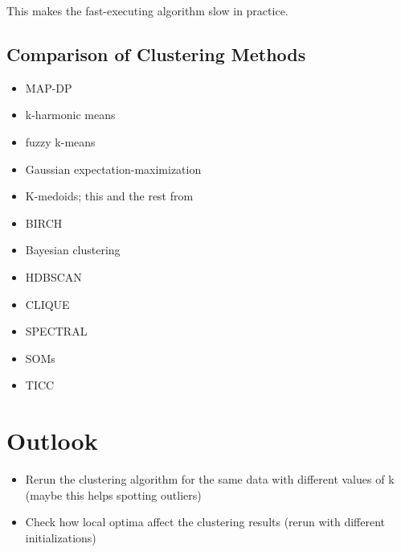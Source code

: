 \begin{description}
    This makes the fast-executing algorithm slow in practice.
\end{description}
\subsection{Comparison of Clustering Methods}
\begin{itemize}
    \item MAP-DP \cite{HAM-ALT}
    \item k-harmonic means \cite{RAY-ALT}
    \item fuzzy k-means \cite{RAY-ALT}
    \item Gaussian expectation-maximization \cite{RAY-ALT}
    \item K-medoids; this and the rest from \cite{COL-ALT}
    \item BIRCH
    \item Bayesian clustering
    \item HDBSCAN
    \item CLIQUE
    \item SPECTRAL
    \item SOMs
    \item TICC
\end{itemize}

\section{Outlook}
\begin{itemize}
    \item Rerun the clustering algorithm for the same data with different values of k (maybe this helps spotting outliers)
    \item Check how local optima affect the clustering results (rerun with different initializations)
\end{itemize}
